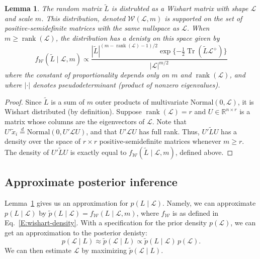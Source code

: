 \documentclass[12pt]{article}
\newcommand{\reals}{\mathbb{R}}
\DeclareMathOperator*{\Tr}{Tr}
\DeclareMathOperator*{\rank}{rank}
\theoremstyle{plain}
\newtheorem{lemma}[theorem]{Lemma}
\begin{document}
\begin{lemma}\label{L:approx-wishart}
  The random matrix $\tilde L$ is distrubted as a Wishart matrix with
  shape $\mathcal{L}$ and scale $m$.  This distribution, denoted
  $\mathcal{W}(\mathcal{L}, m)$ is supported on the set of
  positive-semidefinite matrices with the same nullspace as $\mathcal{L}$.  When
  $m \geq \rank(\mathcal{L})$, the distribution has a denisty on this space
  given by
  \begin{equation}\label{E:wishart-density}
    f_\mathcal{W}( \tilde L \mid \mathcal{L}, m)
      \propto
      \frac{|\tilde L|^{(m - \rank(\mathcal{L}) - 1)/2}
        \exp\{-\tfrac{1}{2} \Tr(\tilde L \mathcal{L}^+) \}}
        {|\mathcal{L}|^{m/2}}
  \end{equation}
  where the constant of proportionality depends only on $m$ and $\rank(\mathcal{L})$,
  and where $|\cdot|$ denotes pseudodeterminant (product of nonzero
  eigenvalues).
\end{lemma}
\begin{proof}
  Since $\tilde L$ is a sum of $m$ outer products of multivariate
  $\mathrm{Normal}(0, \mathcal{L})$, it is Wishart distributed
  (by definition).
  Suppose $\rank(\mathcal{L}) = r$ and
  $U \in \reals^{n \times r}$ is a matrix whose columns are the
    eigenvectors of $\mathcal{L}$.  Note that
    $U' \tilde x_i \overset{d}{=} \mathrm{Normal}(0, U' \mathcal{L} U)$,
    and that $U' \mathcal{L} U$ has full rank.  Thus,
    \(
      U' \tilde L U
    \)
    has a density over the space of $r \times r$ positive-semidefinite
    matrices whenever $m \geq r$.  The density of $U' \tilde L U$ is
    exactly equal to $f_\mathcal{W}(\tilde L \mid \mathcal{L}, m)$,
    defined above.
\end{proof}


\subsection{Approximate posterior inference}

Lemma~\ref{L:approx-wishart} gives us an approximation for
$p(L \mid \mathcal{L})$.  Namely, we can approximate
$p(L \mid \mathcal{L})$ by
$\tilde p(L \mid \mathcal{L}) = f_\mathcal{W}(L \mid \mathcal{L}, m)$,
where $f_\mathcal{W}$ is as defined in Eq.~\eqref{E:wishart-density}.
With a specification for the prior density $p(\mathcal{L})$, we can
get an approximation to the posterior denisty:
\[
  p(\mathcal{L} \mid L)
  \approx
  \tilde p(\mathcal{L} \mid L)
    \propto \tilde p(L \mid \mathcal{L}) \, p(\mathcal{L}).
\]
We can then estimate $\mathcal{L}$ by maximizing
$\tilde p(\mathcal{L} \mid L)$.
\end{document}
